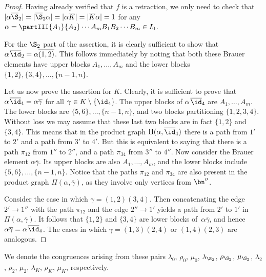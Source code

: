 \begin{proof}
Having already verified that $f$ is a retraction, we only need to check that
$|\alpha\overline{\S}_2|=|\overline{\S}_2\alpha|=|\alpha \overline{K}|=|\overline{K}\alpha|=1$ for any
$\alpha=\partIII{A_1}{A_2}\cdots{A_{m}}{B_1}{B_2}\cdots{B_{m}}\in I_0$.

For the $\S_2$ part of the assertion, it is clearly sufficient to show
that $\alpha\;\!\overline{\id}_2=\alpha\overline{(1, 2)}$.
This 
follows immediately by noting that both these Brauer elements have upper blocks $A_1,\dots,A_m$ and the lower blocks $\{1,2\},\{3,4\},\dots,\{n-1,n\}$.

Let us now prove the assertion for $K$.
Clearly, it is sufficient to prove that
$\alpha \;\!\overline{\id}_4=\alpha\overline{\gamma}$
for all $\gamma\in K\setminus\{\id_4\}$.
The upper blocks of $\alpha\;\!\overline{\id}_4$ are $A_1,\dots,A_m$.
The lower blocks are $\{5,6\},\dots,\{n-1,n\}$, and two blocks
partitioning $\{1,2,3,4\}$.
Without loss we may assume that these last two blocks are in fact $\{1,2\}$ and $\{3,4\}$.
This means that in the product graph $\Pi(\alpha,\overline{\id}_4)$
there is a path from $1'$ to $2'$ and a path from $3'$ to $4'$.
But this is equivalent to saying that there is a path $\pi_{12}$ from $1''$ to $2''$, and a path $\pi_{34}$ from $3''$ to $4''$.
%
Now consider the Brauer element $\alpha\overline{\gamma}$.
Its upper blocks are also $A_1,\dots,A_m$, and the lower blocks include $\{5,6\},\dots,\{n-1,n\}$.
Notice that the paths $\pi_{12}$ and $\pi_{34}$ are also present in the product graph $\Pi(\alpha,\overline{\gamma})$, as they involve only vertices from $\bn''$.

Consider the case in which $\gamma=(1,2)(3,4)$. Then concatenating the edge $2'\to1''$ with the path $\pi_{12}$ and the edge $2''\to1'$ yields a path from $2'$ to $1'$ in $\Pi(\alpha,\overline{\gamma})$.
It follows that $\{1,2\}$ and $\{3,4\}$ are lower blocks of~$\alpha\overline{\gamma}$, and hence $\alpha\overline{\gamma}=\alpha\;\!\overline{\id}_4$.
%
The cases in which $\gamma=(1,3)(2,4)$ or $(1,4)(2,3)$ are analogous. \end{proof}

We denote the congruences arising from these pairs
$\lambda_0$, $\rho_0$, $\mu_0$, $\lambda_{\S_2}$, $\rho_{\S_2}$, $\mu_{\S_2}$,
$\lambda_2$, $\rho_2$, $\mu_2$, $\lambda_K$, $\rho_K$, $\mu_K$, respectively.


